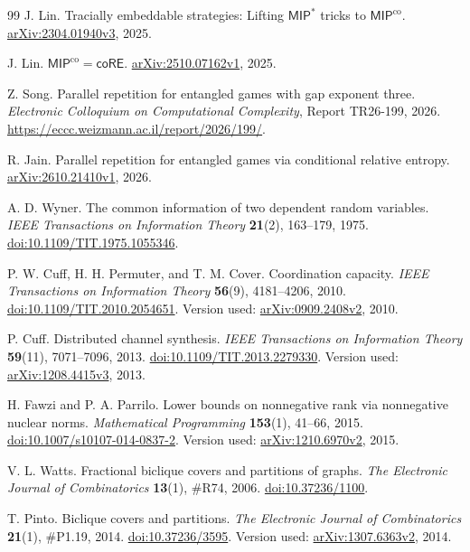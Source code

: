 \documentclass[11pt,reqno]{amsart}
\numberwithin{equation}{section}
\theoremstyle{definition}
\theoremstyle{remark}
\begin{document}
\begin{thebibliography}{99}
J. Lin.
Tracially embeddable strategies: Lifting $\mathsf{MIP}^*$ tricks to
$\mathsf{MIP}^{\mathrm{co}}$.
\href{https://arxiv.org/abs/2304.01940v3}{arXiv:2304.01940v3}, 2025.

J. Lin.
$\mathsf{MIP}^{\mathrm{co}}=\mathsf{coRE}$.
\href{https://arxiv.org/abs/2510.07162v1}{arXiv:2510.07162v1}, 2025.

Z. Song.
Parallel repetition for entangled games with gap exponent three.
\emph{Electronic Colloquium on Computational Complexity}, Report TR26-199, 2026.
\url{https://eccc.weizmann.ac.il/report/2026/199/}.

R. Jain.
Parallel repetition for entangled games via conditional relative entropy.
\href{https://arxiv.org/abs/2610.21410v1}{arXiv:2610.21410v1}, 2026.

A. D. Wyner.
The common information of two dependent random variables.
\emph{IEEE Transactions on Information Theory} \textbf{21}(2), 163--179, 1975.
\href{https://doi.org/10.1109/TIT.1975.1055346}{doi:10.1109/TIT.1975.1055346}.

P. W. Cuff, H. H. Permuter, and T. M. Cover.
Coordination capacity.
\emph{IEEE Transactions on Information Theory} \textbf{56}(9), 4181--4206, 2010.
\href{https://doi.org/10.1109/TIT.2010.2054651}{doi:10.1109/TIT.2010.2054651}.
Version used: \href{https://arxiv.org/abs/0909.2408v2}{arXiv:0909.2408v2}, 2010.

P. Cuff.
Distributed channel synthesis.
\emph{IEEE Transactions on Information Theory} \textbf{59}(11), 7071--7096, 2013.
\href{https://doi.org/10.1109/TIT.2013.2279330}{doi:10.1109/TIT.2013.2279330}.
Version used: \href{https://arxiv.org/abs/1208.4415v3}{arXiv:1208.4415v3}, 2013.

H. Fawzi and P. A. Parrilo.
Lower bounds on nonnegative rank via nonnegative nuclear norms.
\emph{Mathematical Programming} \textbf{153}(1), 41--66, 2015.
\href{https://doi.org/10.1007/s10107-014-0837-2}{doi:10.1007/s10107-014-0837-2}.
Version used: \href{https://arxiv.org/abs/1210.6970v2}{arXiv:1210.6970v2}, 2015.

V. L. Watts.
Fractional biclique covers and partitions of graphs.
\emph{The Electronic Journal of Combinatorics} \textbf{13}(1), \#R74, 2006.
\href{https://doi.org/10.37236/1100}{doi:10.37236/1100}.

T. Pinto.
Biclique covers and partitions.
\emph{The Electronic Journal of Combinatorics} \textbf{21}(1), \#P1.19, 2014.
\href{https://doi.org/10.37236/3595}{doi:10.37236/3595}.
Version used: \href{https://arxiv.org/abs/1307.6363v2}{arXiv:1307.6363v2}, 2014.

\end{thebibliography}

\end{document}
